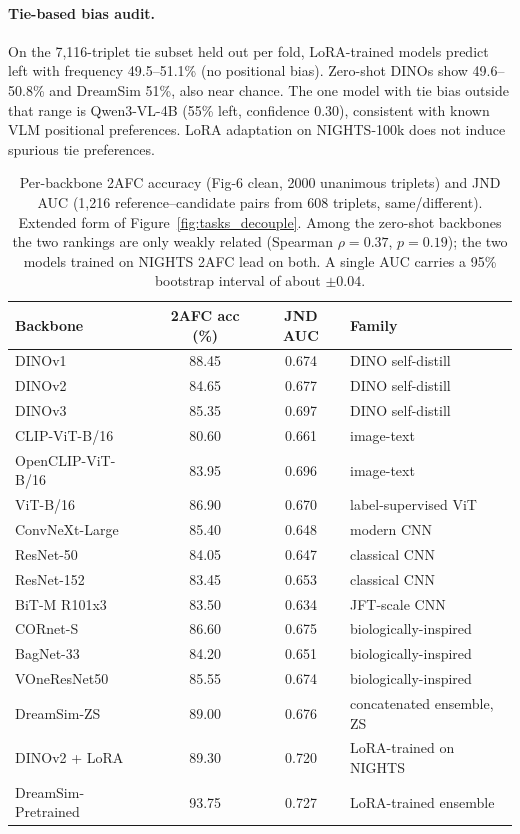 \paragraph{Tie-based bias audit.} On the 7,116-triplet tie subset held out per fold, LoRA-trained models predict left with frequency 49.5--51.1\% (no positional bias). Zero-shot DINOs show 49.6--50.8\% and DreamSim 51\%, also near chance. The one model with tie bias outside that range is Qwen3-VL-4B (55\% left, confidence 0.30), consistent with known VLM positional preferences. LoRA adaptation on NIGHTS-100k does not induce spurious tie preferences.

\clearpage
{}
\vspace{1em}

\begin{table}[ht]
\caption{Per-backbone 2AFC accuracy (Fig-6 clean, 2000 unanimous triplets) and JND AUC (1{,}216 reference--candidate pairs from 608 triplets, same/different). Extended form of Figure~\ref{fig:tasks_decouple}. Among the zero-shot backbones the two rankings are only weakly related (Spearman $\rho = 0.37$, $p = 0.19$); the two models trained on NIGHTS 2AFC lead on both. A single AUC carries a 95\% bootstrap interval of about $\pm 0.04$.}
\label{tab:axes}
\centering
\small
\begin{tabular}{lccl}
\toprule
Backbone & 2AFC acc (\%) & JND AUC & Family \\
\midrule
DINOv1              & 88.45 & 0.674 & DINO self-distill \\
DINOv2              & 84.65 & 0.677 & DINO self-distill \\
DINOv3              & 85.35 & 0.697 & DINO self-distill \\
CLIP-ViT-B/16       & 80.60 & 0.661 & image-text \\
OpenCLIP-ViT-B/16   & 83.95 & 0.696 & image-text \\
ViT-B/16 & 86.90 & 0.670 & label-supervised ViT \\
ConvNeXt-Large      & 85.40 & 0.648 & modern CNN \\
ResNet-50           & 84.05 & 0.647 & classical CNN \\
ResNet-152          & 83.45 & 0.653 & classical CNN \\
BiT-M R101x3        & 83.50 & 0.634 & JFT-scale CNN \\
CORnet-S            & 86.60 & 0.675 & biologically-inspired \\
BagNet-33           & 84.20 & 0.651 & biologically-inspired \\
VOneResNet50        & 85.55 & 0.674 & biologically-inspired \\
DreamSim-ZS     & 89.00 & 0.676 & concatenated ensemble, ZS \\
DINOv2 + LoRA       & 89.30 & 0.720 & LoRA-trained on NIGHTS \\
DreamSim-Pretrained & 93.75 & 0.727 & LoRA-trained ensemble \\
\bottomrule
\end{tabular}
\end{table}

